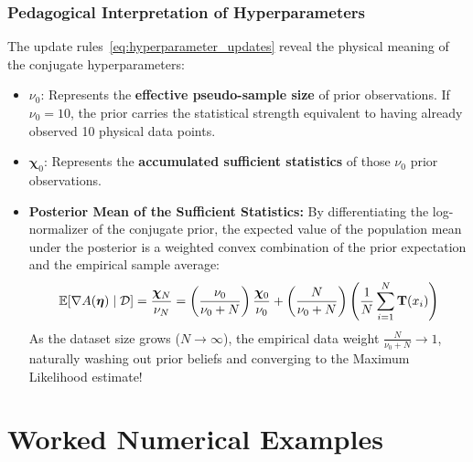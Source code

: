 \subsubsection{Pedagogical Interpretation of Hyperparameters}
The update rules~\eqref{eq:hyperparameter_updates} reveal the physical meaning of the conjugate hyperparameters:
\begin{itemize}
    \item $\nu_0$: Represents the \textbf{effective pseudo-sample size} of prior observations. If $\nu_0 = 10$, the prior carries the statistical strength equivalent to having already observed 10 physical data points.
    \item $\boldsymbol{\chi}_0$: Represents the \textbf{accumulated sufficient statistics} of those $\nu_0$ prior observations.
    \item \textbf{Posterior Mean of the Sufficient Statistics:} By differentiating the log-normalizer of the conjugate prior, the expected value of the population mean under the posterior is a weighted convex combination of the prior expectation and the empirical sample average:
    \begin{equation}
    \operatorname{\mathbb{E}}[\nabla A(\boldsymbol{\eta}) \mid \mathcal{D}] = \frac{\boldsymbol{\chi}_N}{\nu_N} = \left(\frac{\nu_0}{\nu_0 + N}\right) \frac{\boldsymbol{\chi}_0}{\nu_0} + \left(\frac{N}{\nu_0 + N}\right) \left(\frac{1}{N}\sum_{i=1}^N \mathbf{T}(x_i)\right)
    \end{equation}
    As the dataset size grows ($N \to \infty$), the empirical data weight $\frac{N}{\nu_0 + N} \to 1$, naturally washing out prior beliefs and converging to the Maximum Likelihood estimate!
\end{itemize}

\section{Worked Numerical Examples}

